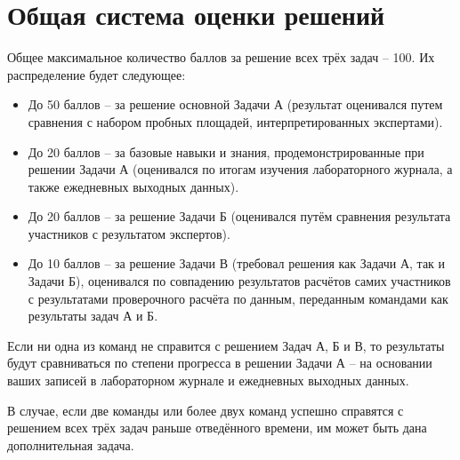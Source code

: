 \section{Общая система оценки решений}

Общее максимальное количество баллов за решение всех трёх задач – 100. Их распределение будет следующее:
\begin{itemize}
    \item До 50 баллов – за решение основной Задачи А (результат оценивался путем сравнения с набором пробных площадей, интерпретированных экспертами).
    \item До 20 баллов – за базовые навыки и знания, продемонстрированные при решении Задачи А (оценивался по итогам изучения лабораторного журнала, а также ежедневных выходных данных).
    \item До 20 баллов – за решение Задачи Б (оценивался путём сравнения результата участников с результатом экспертов).
    \item До 10 баллов – за решение Задачи В (требовал решения как Задачи А, так и Задачи Б), оценивался по совпадению результатов расчётов самих участников с результатами проверочного расчёта по данным, переданным командами как результаты задач А и Б.
\end{itemize}

Если ни одна из команд не справится с решением Задач А, Б и В, то результаты будут сравниваться по степени прогресса в решении Задачи А – на основании ваших записей в лабораторном журнале и ежедневных выходных данных.

В случае, если две команды или более двух команд успешно справятся с решением всех трёх задач раньше отведённого времени, им может быть дана дополнительная задача.